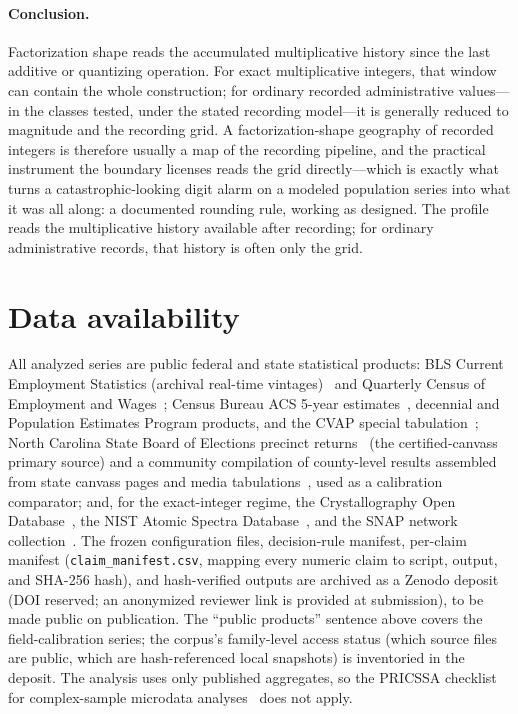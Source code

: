 \documentclass[12pt]{article}
\begin{document}
\paragraph{Conclusion.}
Factorization shape reads the accumulated multiplicative history since the
last additive or quantizing operation. For exact multiplicative integers, that
window can contain the whole construction; for ordinary recorded
administrative values---in the classes tested, under the stated recording
model---it is generally reduced to magnitude and the recording grid. A factorization-shape geography of recorded integers is therefore
usually a map of the recording pipeline, and the practical instrument the
boundary licenses reads the grid directly---which is exactly what turns a
catastrophic-looking digit alarm on a modeled population series into what it
was all along: a documented rounding rule, working as designed. The profile
reads the multiplicative history available after recording; for ordinary
administrative records, that history is often only the grid.

\section*{Data availability}
All analyzed series are public federal and state statistical products: BLS
Current Employment Statistics (archival real-time vintages)~\citep{blsces} and
Quarterly Census of Employment and Wages~\citep{blsqcew}; Census Bureau ACS
5-year estimates~\citep{censusacs}, decennial and Population Estimates Program
products, and the CVAP special tabulation~\citep{censuscvap2022}; North
Carolina State Board of Elections precinct returns~\citep{ncsbe} (the
certified-canvass primary source) and a community compilation of county-level
results assembled from state canvass pages and media
tabulations~\citep{countyreturns}, used as a calibration comparator; and, for
the exact-integer regime, the Crystallography Open Database~\citep{coddb}, the NIST
Atomic Spectra Database~\citep{nistasd}, and the SNAP network
collection~\citep{snap}. The frozen
configuration files, decision-rule manifest, per-claim manifest
(\texttt{claim\_manifest.csv}, mapping every numeric claim to script, output,
and SHA-256 hash), and hash-verified outputs are archived as a Zenodo deposit (DOI reserved;
an anonymized reviewer link is provided at submission), to be made public on
publication. The ``public products'' sentence above covers the field-calibration series;
the corpus's family-level access status (which source files are public,
which are hash-referenced local snapshots) is inventoried in the deposit.
The analysis uses only published aggregates, so the PRICSSA
checklist for complex-sample microdata analyses~\citep{seidenberg2023} does
not apply.
\end{document}
